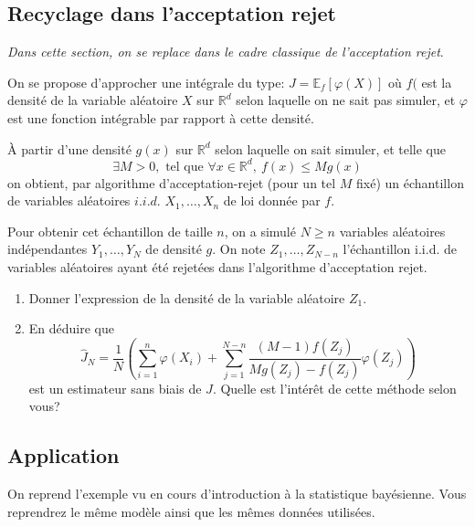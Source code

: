 \documentclass[]{article}
\begin{document}
\hypertarget{recyclage-dans-lacceptation-rejet}{%
\subsection{Recyclage dans l'acceptation
rejet}\label{recyclage-dans-lacceptation-rejet}}

\emph{Dans cette section, on se replace dans le cadre classique de
l'acceptation rejet}.

On se propose d'approcher une intégrale du type:
\(J = \mathbb{E}_f[\varphi(X)]\) où \(f(\) est la densité de la variable
aléatoire \(X\) sur \(\mathbb{R}^d\) selon laquelle on ne sait pas
simuler, et \(\varphi\) est une fonction intégrable par rapport à cette
densité.

À partir d'une densité \(g(x)\) sur \(\mathbb{R}^d\) selon laquelle on
sait simuler, et telle que
\[\exists M>0,\text{ tel que } \forall x\in \mathbb{R}^d,~f(x) \leq Mg(x)\]
on obtient, par algorithme d'acceptation-rejet (pour un tel \(M\) fixé)
un échantillon de variables aléatoires \(i.i.d.\) \(X_1,\dots, X_n\) de
loi donnée par \(f\).

Pour obtenir cet échantillon de taille \(n\), on a simulé \(N\geq n\)
variables aléatoires indépendantes \(Y_1,\dots, Y_N\) de densité \(g\).
On note \(Z_1,\dots,Z_{N - n}\) l'échantillon i.i.d. de variables
aléatoires ayant été rejetées dans l'algorithme d'acceptation rejet.

\begin{enumerate}
\def\labelenumi{\arabic{enumi}.}
\setcounter{enumi}{4}
\item
  Donner l'expression de la densité de la variable aléatoire \(Z_1\).
\item
  En déduire que
  \[\hat{J}_N = \frac{1}{N} \left(\sum_{i = 1}^n \varphi(X_i) + \sum_{j = 1}^{N - n} \frac{(M - 1)f(Z_j)}{Mg(Z_j) - f(Z_j)} \varphi(Z_j) \right)\]
  est un estimateur sans biais de \(J\). Quelle est l'intérêt de cette
  méthode selon vous?
\end{enumerate}

\hypertarget{application}{%
\subsection{Application}\label{application}}

On reprend l'exemple vu en cours d'introduction à la statistique
bayésienne. Vous reprendrez le même modèle ainsi que les mêmes données
utilisées.
\end{document}
